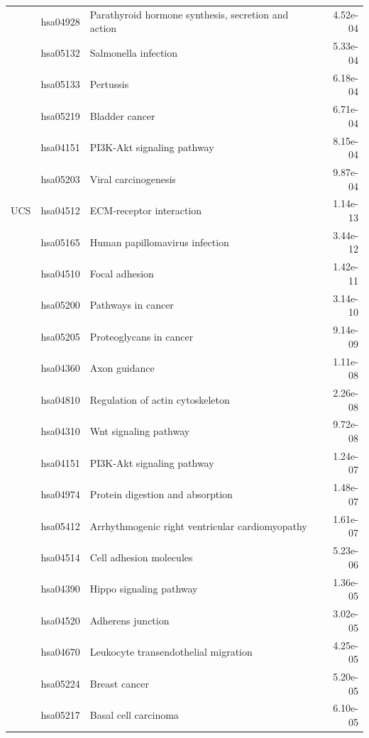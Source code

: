 \begin{longtable}{cllr}
 & hsa04928 & \textcolor{\clrnew}{Parathyroid hormone synthesis, secretion and action} & 4.52e-04 \\ 
 & hsa05132 & \textcolor{\clrnew}{Salmonella infection} & 5.33e-04 \\ 
 & hsa05133 & \textcolor{\clrnew}{Pertussis} & 6.18e-04 \\ 
 & hsa05219 & \textcolor{\clrnew}{Bladder cancer} & 6.71e-04 \\ 
 & hsa04151 & \textcolor{\clrnew}{PI3K-Akt signaling pathway} & 8.15e-04 \\ 
 & hsa05203 & \textcolor{\clrnew}{Viral carcinogenesis} & 9.87e-04 \\ 
\midrule 
\rowcolor{\clrmatch} UCS & hsa04512 & ECM-receptor interaction & 1.14e-13\\ 
 & hsa05165 & \textcolor{\clrnew}{Human papillomavirus infection} & 3.44e-12 \\ 
 \rowcolor{\clrmatch}& hsa04510 & Focal adhesion & 1.42e-11 \\ 
 & hsa05200 & \textcolor{\clrnew}{Pathways in cancer} & 3.14e-10 \\ 
 & hsa05205 & \textcolor{\clrnew}{Proteoglycans in cancer} & 9.14e-09 \\ 
 & hsa04360 & \textcolor{\clrnew}{Axon guidance} & 1.11e-08 \\ 
 & hsa04810 & \textcolor{\clrnew}{Regulation of actin cytoskeleton} & 2.26e-08 \\ 
 & hsa04310 & \textcolor{\clrnew}{Wnt signaling pathway} & 9.72e-08 \\ 
 & hsa04151 & \textcolor{\clrnew}{PI3K-Akt signaling pathway} & 1.24e-07 \\ 
 \rowcolor{\clrmatch}& hsa04974 & Protein digestion and absorption & 1.48e-07 \\ 
 & hsa05412 & \textcolor{\clrnew}{Arrhythmogenic right ventricular cardiomyopathy} & 1.61e-07 \\ 
 & hsa04514 & \textcolor{\clrnew}{Cell adhesion molecules} & 5.23e-06 \\ 
 & hsa04390 & \textcolor{\clrnew}{Hippo signaling pathway} & 1.36e-05 \\ 
 & hsa04520 & \textcolor{\clrnew}{Adherens junction} & 3.02e-05 \\ 
 & hsa04670 & \textcolor{\clrnew}{Leukocyte transendothelial migration} & 4.25e-05 \\ 
 & hsa05224 & \textcolor{\clrnew}{Breast cancer} & 5.20e-05 \\ 
 & hsa05217 & \textcolor{\clrnew}{Basal cell carcinoma} & 6.10e-05 \\ 

\end{longtable}

